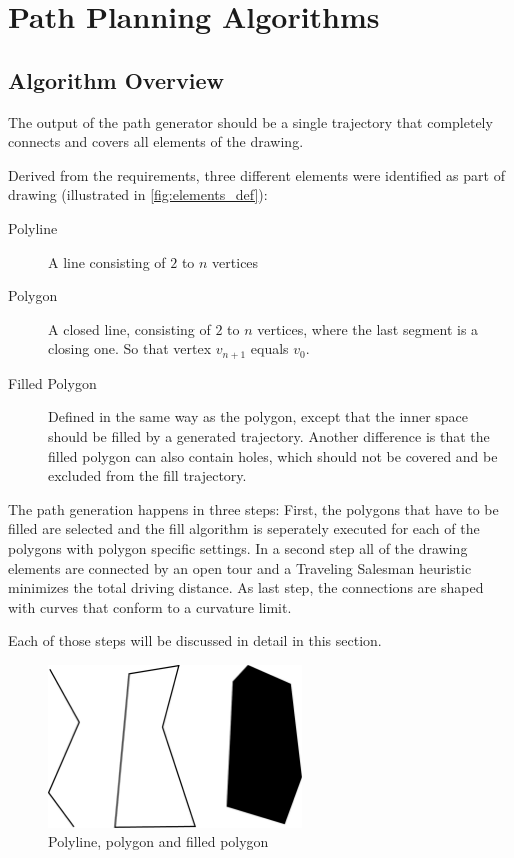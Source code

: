 \chapter{Path Planning Algorithms}
\section{Algorithm Overview}

The output of the path generator should be a single trajectory that completely connects and covers all elements of the drawing.

Derived from the requirements, three different elements were identified as part of drawing (illustrated in \autoref{fig:elements_def}):

\begin{description}
\item[Polyline] A line consisting of $2$ to $n$ vertices
\item[Polygon] A closed line, consisting of $2$ to $n$ vertices, where the last segment is a closing one. So that vertex $v_{n+1}$ equals $v_0$.
\item[Filled Polygon] Defined in the same way as the polygon, except that the inner space should be filled by a generated trajectory. Another difference is that the filled polygon can also contain holes, which should not be covered and be excluded from the fill trajectory.
\end{description}

The path generation happens in three steps: First, the polygons that have to be filled are selected and the fill algorithm is seperately executed for each of the polygons with polygon specific settings. In a second step all of the drawing elements are connected by an open tour and a Traveling Salesman heuristic minimizes the total driving distance. As last step, the connections are shaped with curves that conform to  a curvature limit.

Each of those steps will be discussed in detail in this section.

\begin{figure}
\centering
\includegraphics[width=0.6\textwidth]{images/path_planning/line_polygon_definition.pdf}
\caption{Polyline, polygon and filled polygon}
\label{fig:elements_def}
\end{figure}

